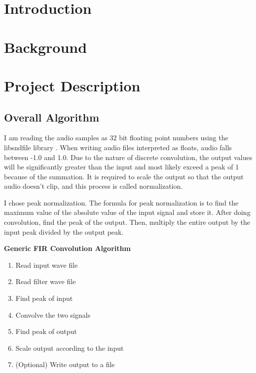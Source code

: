 





\section{Introduction}



\section{Background}


\section{Project Description}
\subsection{Overall Algorithm}
I am reading the audio samples as 32 bit floating point numbers using the libsndfile library \citep{lopo_2013}. When writing audio files interpreted as floats, audio falls between -1.0 and 1.0. Due to the nature of discrete convolution, the output values will be significantly greater than the input and most likely exceed a peak of 1 because of the summation. It is required to scale the output so that the output audio doesn't clip, and this process is called normalization.

I chose peak normalization. The formula for peak normalization is to find the maximum value of the absolute value of the input signal and store it. After doing convolution, find the peak of the output. Then, multiply the entire output by the input peak divided by the output peak. 

\vspace{5mm}
\textbf{Generic FIR Convolution Algorithm}
\begin{enumerate}
   \item Read input wave file
   \item Read filter wave file
   \item Find peak of input
   \item Convolve the two signals
   \item Find peak of output
   \item Scale output according to the input
   \item (Optional) Write output to a file
\end{enumerate}


